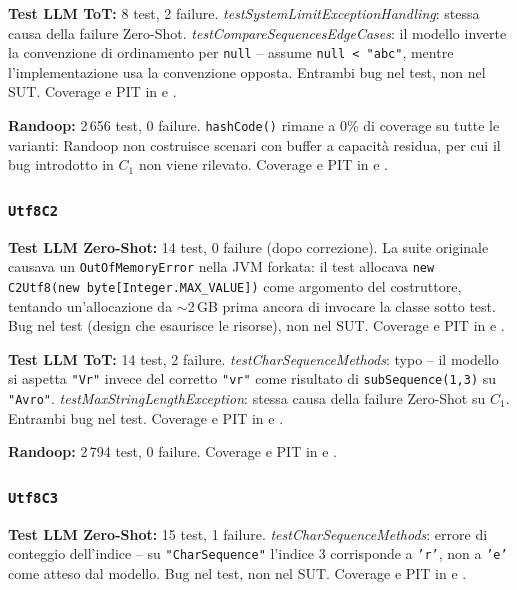 \textbf{Test LLM ToT:} 8 test, 2 failure.
\textit{testSystemLimitExceptionHandling}: stessa causa della
failure Zero-Shot.
\textit{testCompareSequencesEdgeCases}: il modello inverte la
convenzione di ordinamento per \texttt{null} -- assume
\texttt{null~<~"abc"}, mentre l'implementazione usa la convenzione
opposta. Entrambi bug nel test, non nel SUT.
Coverage e PIT in  e
.

\textbf{Randoop:} 2\,656 test, 0 failure.
\texttt{hashCode()} rimane a 0\% di coverage su tutte le varianti:
Randoop non costruisce scenari con buffer a capacità residua,
per cui il bug introdotto in $C_1$ non viene rilevato.
Coverage e PIT in  e
.

\subsubsection{\texttt{Utf8C2}}

\textbf{Test LLM Zero-Shot:} 14 test, 0 failure (dopo correzione).
La suite originale causava un \texttt{OutOfMemoryError} nella JVM
forkata: il test allocava \texttt{new C2Utf8(new byte[Integer.MAX\_VALUE])}
come argomento del costruttore, tentando un'allocazione da
$\sim$2\,GB prima ancora di invocare la classe sotto test. Bug nel
test (design che esaurisce le risorse), non nel SUT.
Coverage e PIT in  e
.

\textbf{Test LLM ToT:} 14 test, 2 failure.
\textit{testCharSequenceMethods}: typo -- il modello si aspetta
\texttt{"Vr"} invece del corretto \texttt{"vr"} come risultato di
\texttt{subSequence(1,3)} su \texttt{"Avro"}.
\textit{testMaxStringLengthException}: stessa causa della failure
Zero-Shot su $C_1$. Entrambi bug nel test.
Coverage e PIT in  e
.

\textbf{Randoop:} 2\,794 test, 0 failure.
Coverage e PIT in  e
.

\subsubsection{\texttt{Utf8C3}}

\textbf{Test LLM Zero-Shot:} 15 test, 1 failure.
\textit{testCharSequenceMethods}: errore di conteggio dell'indice --
su \texttt{"CharSequence"} l'indice 3 corrisponde a \texttt{'r'},
non a \texttt{'e'} come atteso dal modello. Bug nel test, non nel SUT.
Coverage e PIT in  e
.

